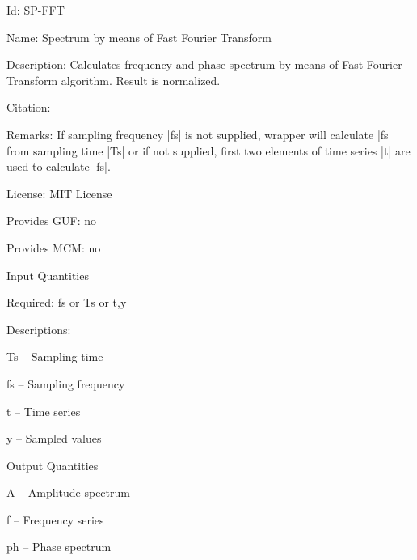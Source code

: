 \begin{tightdesc}
\item [Id:] SP-FFT
\item [Name:] Spectrum by means of Fast Fourier Transform
\item [Description:] Calculates frequency and phase spectrum by means of Fast Fourier Transform algorithm. Result is normalized.
\item [Citation:] 
\item [Remarks:] If sampling frequency |fs| is not supplied, wrapper will calculate |fs| from sampling time |Ts| or if not supplied, first two elements of time series |t| are used to calculate |fs|.
\item [License:] MIT License
\item [Provides GUF:] no
\item [Provides MCM:] no
\item [Input Quantities] \rule{0em}{0em}
    \begin{tightdesc}
    \item [Required:] 
        \textsf{fs} or \textsf{Ts} or \textsf{t},\enspace \textsf{y}
    \end{tightdesc}
\item [Descriptions:] \rule{0em}{0em}
    \begin{tightdesc}
        \item[\textsf{Ts}] -- Sampling time
        \item[\textsf{fs}] -- Sampling frequency
        \item[\textsf{t}] -- Time series
        \item[\textsf{y}] -- Sampled values
    \end{tightdesc}
\item [Output Quantities] \rule{0em}{0em}
    \begin{tightdesc}
        \item[\textsf{A}] -- Amplitude spectrum
        \item[\textsf{f}] -- Frequency series
        \item[\textsf{ph}] -- Phase spectrum
    \end{tightdesc}
\end{tightdesc}
